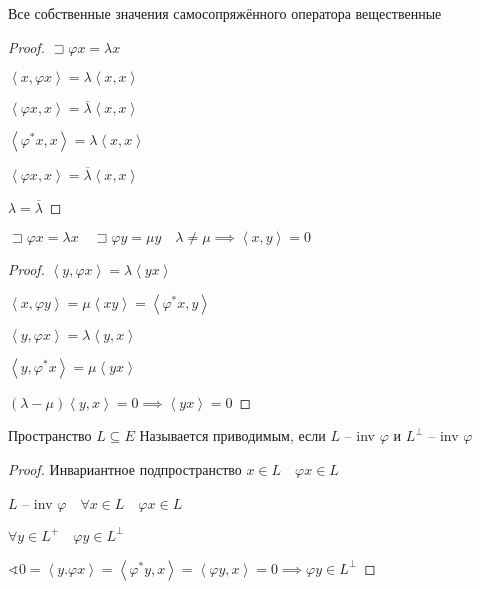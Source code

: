 \documentclass{book}
\newcommand{\ov}[1]{\overline{#1}}
\theoremstyle{definition}
\begin{document}
\begin{lemma}
    Все собственные значения самосопряжённого оператора вещественные
\end{lemma}
\begin{proof}
    $\sqsupset \varphi x  = \lambda x$

    $\left<x, \varphi x \right> = \lambda \left<x, x \right>$ 

    $\left<\varphi x, x \right> = \ov \lambda \left<x, x \right>$

    $\left<\varphi^* x, x \right> = \lambda \left<x, x \right>$

    $\left<\varphi x, x \right> = \ov \lambda \left<x, x \right>$

    $\lambda = \ov \lambda$


\end{proof}

\begin{lemma}
    $\sqsupset \varphi x = \lambda x\quad \sqsupset \varphi y = \mu y\quad \lambda \neq  \mu \implies  \left<x, y \right> = 0$
\end{lemma}
\begin{proof}
    $\left< y, \varphi x \right> = \lambda \left<y x \right>$

    $\left<x, \varphi y \right> = \mu \left< x y \right> = \left<\varphi^* x, y \right>$ 

    $\left<y, \varphi x \right> = \lambda \left<y, x \right>$

    $\left<y, \varphi^* x \right> = \mu \left<y x \right>$

    $(\lambda - \mu)\left<y, x \right> = 0 \implies \left<y x \right> = 0$
\end{proof}

\begin{definition}
    Пространство $L\subseteq  E$ Называется приводимым, если $L$ -- inv  $\varphi$ и  $L^{\perp}$ -- inv  $\varphi$
\end{definition}
\begin{proof}
    Инвариантное подпространство $x\in L\quad \varphi x\in L$

     $L$ -- inv  $\varphi\quad \forall x\in L\quad \varphi x\in L$

     $\forall y\in L^+\quad \varphi y\in L^{\perp}$

     $\sphericalangle 0 = \left<y.  \varphi x \right> = \left<\varphi^* y, x \right> = \left<\varphi y, x \right> = 0 \implies  \varphi y\in L^{\perp}$
\end{proof}
\end{document}

